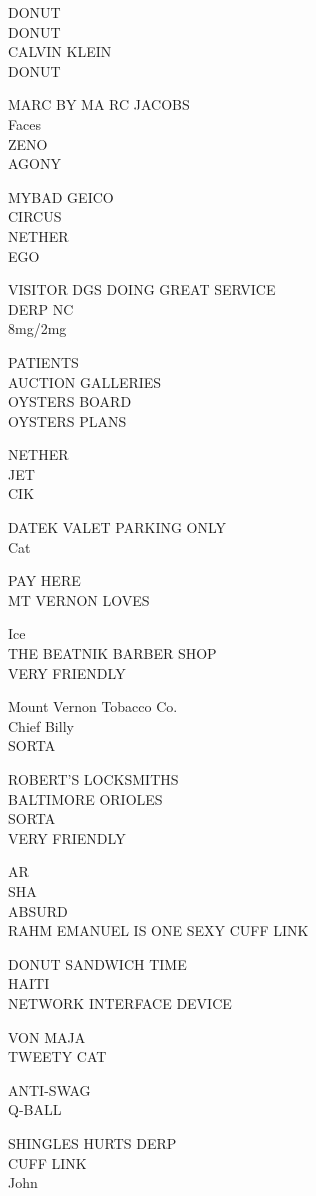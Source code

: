 \documentclass[10pt,letterpaper]{article}
\begin{document}
DONUT\\
DONUT\\
CALVIN KLEIN\\
DONUT

MARC BY MA RC JACOBS\\
Faces\\
ZENO\\
AGONY

MYBAD GEICO\\
CIRCUS\\
NETHER\\
EGO

VISITOR DGS DOING GREAT SERVICE\\
DERP NC\\
8mg/2mg

PATIENTS\\
AUCTION GALLERIES\\
OYSTERS BOARD\\
OYSTERS PLANS

NETHER\\
JET\\
CIK

DATEK VALET PARKING ONLY\\
Cat

PAY HERE\\
MT VERNON LOVES

Ice\\
THE BEATNIK BARBER SHOP\\
VERY FRIENDLY

Mount Vernon Tobacco Co.\\
Chief Billy\\
SORTA

ROBERT'S LOCKSMITHS\\
BALTIMORE ORIOLES\\
SORTA\\
VERY FRIENDLY

AR\\
SHA\\
ABSURD\\
RAHM EMANUEL IS ONE SEXY CUFF LINK

DONUT SANDWICH TIME\\
HAITI\\
NETWORK INTERFACE DEVICE

VON MAJA\\
TWEETY CAT

ANTI{-}SWAG\\
Q{-}BALL

SHINGLES HURTS DERP\\
CUFF LINK\\
John
\end{document}
